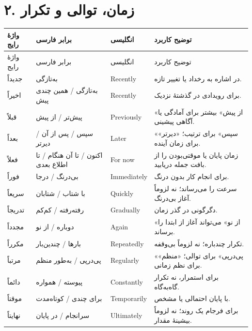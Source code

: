 \section*{۲. زمان، توالی و تکرار}
\begingroup
\small
\setlength{\tabcolsep}{4pt}
\renewcommand{\arraystretch}{1.3}
\begin{longtable}{|p{2.5cm}|p{4.0cm}|p{2.3cm}|p{5.3cm}|}
\hline
واژهٔ رایج & برابر فارسی & انگلیسی & توضیح کاربرد \\
\hline
\endfirsthead
\hline
واژهٔ رایج & برابر فارسی & انگلیسی & توضیح کاربرد \\
\hline
\endhead

جدیداً & به‌تازگی & \textenglish{Recently} & در اشاره به رخداد یا تغییر تازه. \\
\hline
اخیراً & به‌تازگی / همین چندی پیش & \textenglish{Recently} & برای رویدادی در گذشتهٔ نزدیک. \\
\hline
قبلاً & پیش‌تر / از پیش & \textenglish{Previously} & «از پیش» بیشتر برای آمادگی یا آگاهی پیشینی. \\
\hline
بعداً & سپس / پس از آن / دیرتر & \textenglish{Later} & «سپس» برای ترتیب؛ «دیرتر» برای زمان آینده. \\
\hline
فعلاً & اکنون / تا آن هنگام / تا اطلاع بعدی & \textenglish{For now} & زمان پایان یا موقتی‌بودن را از بافت جمله دریابید. \\
\hline
فوراً & بی‌درنگ / درجا & \textenglish{Immediately} & برای انجام کار بدون درنگ. \\
\hline
سریعاً & با شتاب / شتابان & \textenglish{Quickly} & سرعت را می‌رساند؛ نه لزوماً آغاز بی‌درنگ. \\
\hline
تدریجاً & رفته‌رفته / کم‌کم & \textenglish{Gradually} & دگرگونی در گذر زمان. \\
\hline
مجدداً & دوباره / از نو & \textenglish{Again} & «از نو» می‌تواند آغاز از ابتدا را برساند. \\
\hline
مکرراً & بارها / چندین‌بار & \textenglish{Repeatedly} & تکرار چندباره؛ نه لزوماً بی‌وقفه. \\
\hline
مرتباً & پی‌درپی / به‌طور منظم & \textenglish{Regularly} & «پی‌درپی» برای توالی؛ «منظم» برای نظم زمانی. \\
\hline
دائماً & پیوسته / همواره & \textenglish{Constantly} & برای استمرار، نه تکرار گاه‌به‌گاه. \\
\hline
موقتاً & برای چندی / کوتاه‌مدت & \textenglish{Temporarily} & با پایان احتمالی یا مشخص. \\
\hline
نهایتاً & سرانجام / در پایان & \textenglish{Ultimately} & برای فرجام یک روند؛ نه لزوماً بیشینهٔ مقدار. \\

\end{longtable}
